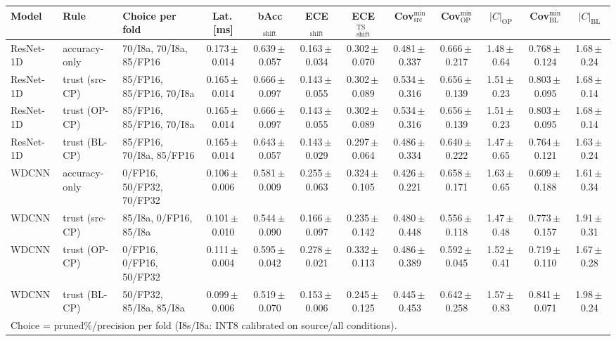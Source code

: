 \begin{tabular}{ll l ccccccccc}
\toprule
Model & Rule & Choice per fold & Lat.\,[ms] & bAcc$_{\mathrm{shift}}$ & ECE$_{\mathrm{shift}}$ & ECE$^{\mathrm{TS}}_{\mathrm{shift}}$ & Cov$^{\min}_{\mathrm{src}}$ & Cov$^{\min}_{\mathrm{OP}}$ & $|C|_{\mathrm{OP}}$ & Cov$^{\min}_{\mathrm{BL}}$ & $|C|_{\mathrm{BL}}$ \\
\midrule
ResNet-1D & accuracy-only & 70/I8a, 70/I8a, 85/FP16 & 0.173\,$\pm$\,0.014 & 0.639\,$\pm$\,0.057 & 0.163\,$\pm$\,0.034 & 0.302\,$\pm$\,0.070 & 0.481\,$\pm$\,0.337 & 0.666\,$\pm$\,0.217 & 1.48\,$\pm$\,0.64 & 0.768\,$\pm$\,0.124 & 1.68\,$\pm$\,0.24 \\
ResNet-1D & trust (src-CP) & 85/FP16, 85/FP16, 70/I8a & 0.165\,$\pm$\,0.014 & 0.666\,$\pm$\,0.097 & 0.143\,$\pm$\,0.055 & 0.302\,$\pm$\,0.089 & 0.534\,$\pm$\,0.316 & 0.656\,$\pm$\,0.139 & 1.51\,$\pm$\,0.23 & 0.803\,$\pm$\,0.095 & 1.68\,$\pm$\,0.14 \\
ResNet-1D & trust (OP-CP) & 85/FP16, 85/FP16, 70/I8a & 0.165\,$\pm$\,0.014 & 0.666\,$\pm$\,0.097 & 0.143\,$\pm$\,0.055 & 0.302\,$\pm$\,0.089 & 0.534\,$\pm$\,0.316 & 0.656\,$\pm$\,0.139 & 1.51\,$\pm$\,0.23 & 0.803\,$\pm$\,0.095 & 1.68\,$\pm$\,0.14 \\
ResNet-1D & trust (BL-CP) & 85/FP16, 70/I8a, 85/FP16 & 0.165\,$\pm$\,0.014 & 0.643\,$\pm$\,0.057 & 0.143\,$\pm$\,0.029 & 0.297\,$\pm$\,0.064 & 0.486\,$\pm$\,0.334 & 0.640\,$\pm$\,0.222 & 1.47\,$\pm$\,0.65 & 0.764\,$\pm$\,0.121 & 1.63\,$\pm$\,0.24 \\
WDCNN & accuracy-only & 0/FP16, 50/FP32, 70/FP32 & 0.106\,$\pm$\,0.006 & 0.581\,$\pm$\,0.009 & 0.255\,$\pm$\,0.063 & 0.324\,$\pm$\,0.105 & 0.426\,$\pm$\,0.221 & 0.658\,$\pm$\,0.171 & 1.63\,$\pm$\,0.65 & 0.609\,$\pm$\,0.188 & 1.61\,$\pm$\,0.34 \\
WDCNN & trust (src-CP) & 85/I8a, 0/FP16, 85/I8a & 0.101\,$\pm$\,0.010 & 0.544\,$\pm$\,0.090 & 0.166\,$\pm$\,0.097 & 0.235\,$\pm$\,0.142 & 0.480\,$\pm$\,0.448 & 0.556\,$\pm$\,0.118 & 1.47\,$\pm$\,0.48 & 0.773\,$\pm$\,0.157 & 1.91\,$\pm$\,0.31 \\
WDCNN & trust (OP-CP) & 0/FP16, 0/FP16, 50/FP32 & 0.111\,$\pm$\,0.004 & 0.595\,$\pm$\,0.042 & 0.278\,$\pm$\,0.021 & 0.332\,$\pm$\,0.113 & 0.486\,$\pm$\,0.389 & 0.592\,$\pm$\,0.045 & 1.52\,$\pm$\,0.41 & 0.719\,$\pm$\,0.110 & 1.67\,$\pm$\,0.28 \\
WDCNN & trust (BL-CP) & 50/FP32, 85/I8a, 85/I8a & 0.099\,$\pm$\,0.006 & 0.519\,$\pm$\,0.070 & 0.153\,$\pm$\,0.006 & 0.245\,$\pm$\,0.125 & 0.445\,$\pm$\,0.453 & 0.642\,$\pm$\,0.258 & 1.57\,$\pm$\,0.83 & 0.841\,$\pm$\,0.071 & 1.98\,$\pm$\,0.24 \\
\bottomrule
\multicolumn{12}{l}{\footnotesize Choice = pruned\%/precision per fold (I8s/I8a: INT8 calibrated on source/all conditions).}\\
\end{tabular}